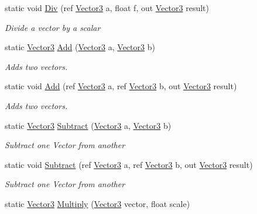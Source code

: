 \begin{DoxyCompactItemize}
static void \hyperlink{struct_open_t_k_1_1_vector3_a347b4dce4ae8c020e823afa8b028f6ce}{Div} (ref \hyperlink{struct_open_t_k_1_1_vector3}{Vector3} a, float f, out \hyperlink{struct_open_t_k_1_1_vector3}{Vector3} result)
\begin{DoxyCompactList}\small\item\em Divide a vector by a scalar \end{DoxyCompactList}\item 
static \hyperlink{struct_open_t_k_1_1_vector3}{Vector3} \hyperlink{struct_open_t_k_1_1_vector3_a159e8b71e499944985edef8e0a3bf02a}{Add} (\hyperlink{struct_open_t_k_1_1_vector3}{Vector3} a, \hyperlink{struct_open_t_k_1_1_vector3}{Vector3} b)
\begin{DoxyCompactList}\small\item\em Adds two vectors. \end{DoxyCompactList}\item 
static void \hyperlink{struct_open_t_k_1_1_vector3_a3fec7fbb50b9becc786ee9e9f376ab80}{Add} (ref \hyperlink{struct_open_t_k_1_1_vector3}{Vector3} a, ref \hyperlink{struct_open_t_k_1_1_vector3}{Vector3} b, out \hyperlink{struct_open_t_k_1_1_vector3}{Vector3} result)
\begin{DoxyCompactList}\small\item\em Adds two vectors. \end{DoxyCompactList}\item 
static \hyperlink{struct_open_t_k_1_1_vector3}{Vector3} \hyperlink{struct_open_t_k_1_1_vector3_a62c60fd2d77ddc78e6faea298f008acd}{Subtract} (\hyperlink{struct_open_t_k_1_1_vector3}{Vector3} a, \hyperlink{struct_open_t_k_1_1_vector3}{Vector3} b)
\begin{DoxyCompactList}\small\item\em Subtract one Vector from another \end{DoxyCompactList}\item 
static void \hyperlink{struct_open_t_k_1_1_vector3_a57d728e53a3320b8c29c2f74eb0cb699}{Subtract} (ref \hyperlink{struct_open_t_k_1_1_vector3}{Vector3} a, ref \hyperlink{struct_open_t_k_1_1_vector3}{Vector3} b, out \hyperlink{struct_open_t_k_1_1_vector3}{Vector3} result)
\begin{DoxyCompactList}\small\item\em Subtract one Vector from another \end{DoxyCompactList}\item 
static \hyperlink{struct_open_t_k_1_1_vector3}{Vector3} \hyperlink{struct_open_t_k_1_1_vector3_a08a332aa8a73c37588f8bafb0fbe232b}{Multiply} (\hyperlink{struct_open_t_k_1_1_vector3}{Vector3} vector, float scale)

\end{DoxyCompactItemize}
